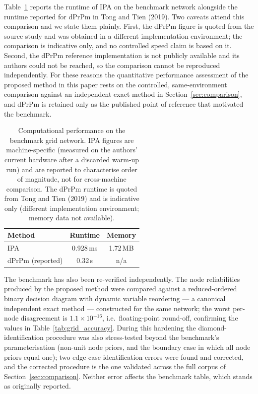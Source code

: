 \documentclass[preprint,12pt]{elsarticle}
\theoremstyle{definition}
\begin{document}
Table~\ref{tab:grid_runtime} reports the runtime of IPA on the benchmark network alongside the runtime
reported for dPrPm in Tong and Tien (2019). Two caveats attend this comparison and we state them
plainly. First, the dPrPm figure is quoted from the source study and was obtained in a different
implementation environment; the comparison is indicative only, and no controlled speed claim is based on
it. Second, the dPrPm reference implementation is not publicly available and its authors could not be
reached, so the comparison cannot be reproduced independently. For these reasons the quantitative
performance assessment of the proposed method in this paper rests on the controlled, same-environment
comparison against an independent exact method in Section~\ref{sec:comparison}, and dPrPm is retained
only as the published point of reference that motivated the benchmark.

\begin{table}[t]
\centering\small
\caption{Computational performance on the benchmark grid network. IPA figures are machine-specific
(measured on the authors' current hardware after a discarded warm-up run) and are reported to
characterise order of magnitude, not for cross-machine comparison. The dPrPm runtime is quoted from Tong
and Tien (2019) and is indicative only (different implementation environment; memory data not
available).}
\label{tab:grid_runtime}
\begin{tabular}{lcc}
\toprule
Method & Runtime & Memory\\
\midrule
IPA & 0.928\,ms & 1.72\,MB\\
dPrPm (reported) & 0.32\,s & n/a\\
\bottomrule
\end{tabular}
\end{table}

The benchmark has also been re-verified independently. The node reliabilities produced by the proposed
method were compared against a reduced-ordered binary decision diagram with dynamic variable reordering
--- a canonical independent exact method --- constructed for the same network; the worst per-node
disagreement is $1.1\times10^{-16}$, i.e.\ floating-point round-off, confirming the values in
Table~\ref{tab:grid_accuracy}. During this hardening the diamond-identification procedure was also
stress-tested beyond the benchmark's parameterisation (non-unit node priors, and the boundary case in
which all node priors equal one); two edge-case identification errors were found and corrected, and the
corrected procedure is the one validated across the full corpus of Section~\ref{sec:comparison}. Neither
error affects the benchmark table, which stands as originally reported.
\end{document}
